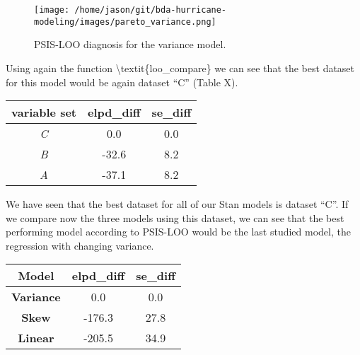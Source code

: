 \documentclass[
]{article}
\begin{document}
\begin{figure}
\centering
\texttt{[image: /home/jason/git/bda-hurricane-modeling/images/pareto\_variance.png]}
\caption{PSIS-LOO diagnosis for the variance model.}
\end{figure}

Using again the function \textbackslash textit\{loo\_compare\} we can
see that the best dataset for this model would be again dataset ``C''
(Table X).

\begin{longtable}[]{@{}ccc@{}}
\toprule
variable set & \textbf{elpd\_diff} & \textbf{se\_diff}\tabularnewline
\midrule
\endhead
\emph{C} & 0.0 & 0.0\tabularnewline
\emph{B} & -32.6 & 8.2\tabularnewline
\emph{A} & -37.1 & 8.2\tabularnewline
\bottomrule
\end{longtable}

We have seen that the best dataset for all of our Stan models is dataset
``C''. If we compare now the three models using this dataset, we can see
that the best performing model according to PSIS-LOO would be the last
studied model, the regression with changing variance.

\begin{longtable}[]{@{}ccc@{}}
\toprule
Model & \textbf{elpd\_diff} & \textbf{se\_diff}\tabularnewline
\midrule
\endhead
\textbf{Variance} & 0.0 & 0.0\tabularnewline
\textbf{Skew} & -176.3 & 27.8\tabularnewline
\textbf{Linear} & -205.5 & 34.9\tabularnewline
\bottomrule
\end{longtable}
\end{document}
